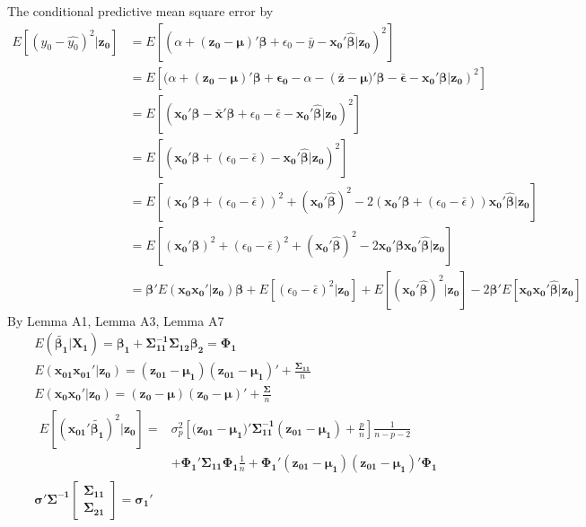 \documentclass[11pt]{article}
\begin{document}
The conditional predictive mean square error by 
$$\begin{aligned}
E[(y_0-\hat{y_0})^2|\boldsymbol{z_0}]
&=E[(\alpha+\boldsymbol{(z_0-\mu)'\beta}+\epsilon_0-\bar{y}-\boldsymbol{x_{0}'\hat{\beta}}|\boldsymbol{z_0})^2]\\
&=E[(\alpha+\boldsymbol{(z_0-\mu)'\beta+\epsilon_0}-\alpha-(\boldsymbol{\bar{z}-\mu)'\beta-\bar{\epsilon}-x_0'\beta|z_0})^2]\\&=E[(\boldsymbol{x_{0}'\beta}-\boldsymbol{\bar{x}'\beta}+\epsilon_0-\bar{\epsilon}-\boldsymbol{x_{0}'\hat{\beta}}|\boldsymbol{z_0})^2]\\
&=E[(\boldsymbol{x_{0}'\beta}+(\epsilon_0-\bar{\epsilon})-\boldsymbol{x_{0}'\hat{\beta}}|\boldsymbol{z_0})^2]\\
&=E[(\boldsymbol{x_0'\beta}+(\epsilon_0-\bar{\epsilon}))^2+(\boldsymbol{x_0'\hat{\beta}})^2-2(\boldsymbol{x_0'\beta}+(\epsilon_0-\bar{\epsilon}))\boldsymbol{x_0'\hat{\beta}}|\boldsymbol{z_0}]\\
&=E[(\boldsymbol{x_0'\beta})^2+(\epsilon_0-\bar{\epsilon})^2+(\boldsymbol{x_0'\hat{\beta}})^2
-2\boldsymbol{x_0'\beta x_0'\hat{\beta}}|\boldsymbol{z_0}]\\
&=\boldsymbol{\beta'}E(\boldsymbol{x_0x_0'}|\boldsymbol{z_0})\boldsymbol{\beta}+E[(\epsilon_0-\bar{\epsilon})^2|\boldsymbol{z_0}]+E[(\boldsymbol{x_0'\hat{\beta}})^2|\boldsymbol{z_0}]-2\boldsymbol{\beta'}E[\boldsymbol{x_0x_0'\hat{\beta}}|\boldsymbol{z_0}]
\end{aligned}$$
By Lemma A1, Lemma A3, Lemma A7
$$\begin{aligned}
&E(\boldsymbol{\tilde{\beta_1}}|\boldsymbol{X_1})=\boldsymbol{\beta_1}+\boldsymbol{\Sigma_{11}^{-1}\Sigma_{12}\beta_{2}} = \boldsymbol{\Phi_1} \label{lemmaA1}\\
&E(\boldsymbol{x_{01}x_{01}'}|\boldsymbol{z_0})=(\boldsymbol{z_{01}}-\boldsymbol{\mu_1})(\boldsymbol{z_{01}}-\boldsymbol{\mu_1})'+\frac{\boldsymbol{\Sigma_{11}}}{n}\label{LemmaA3}\\
&E(\boldsymbol{x_0x_0'}|\boldsymbol{z_0})=(\boldsymbol{z_0-\mu})(\boldsymbol{z_0}-\boldsymbol{\mu})'+\frac{\boldsymbol{\Sigma}}{n}\label{LemmaA3.1}\\
&
\begin{aligned}E[(\boldsymbol{x_{01}'\tilde{\beta_1}})^2|\boldsymbol{z_0}]
=&\sigma_p^2 \left[(\boldsymbol{z_{01}-\mu_1)'\Sigma_{11}^{-1}(z_{01}-\mu_1)}+\frac{p}{n}\right]\frac{1}{n-p-2}\\
&+\boldsymbol{\Phi_1'\Sigma_{11}\Phi_1}\frac{1}{n}+\boldsymbol{\Phi_{1}'(z_{01}-\mu_{1})(z_{01}-\mu_1)'\Phi_1}\label{LemmaA7}
\end{aligned}\\
&\boldsymbol{\sigma'\Sigma^{-1}\begin{bmatrix}\Sigma_{11}\\\Sigma_{21}\end{bmatrix}=\sigma_1'}\label{LemmaA9}
\end{aligned}
$$
\end{document}
